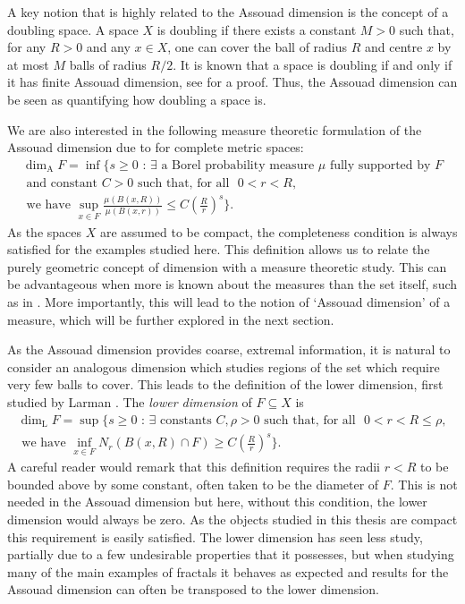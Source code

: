 A key notion that is highly related to the Assouad dimension is the concept of a doubling space. A space $X$ is doubling if there exists a constant $M > 0$ such that, for any $R > 0$ and any $x \in X$, one can cover the ball of radius $R$ and centre $x$ by at most $M$ balls of radius $R/2$. It is known that a space is doubling if and only if it has finite Assouad dimension, see \cite[Lemma 9.4]{robinson} for a proof. Thus, the Assouad dimension can be seen as quantifying how doubling a space is.

We are also interested in the following measure theoretic formulation of the Assouad dimension due to \cite{luksak, konyagin} for complete metric spaces: 
\begin{align*}
   \dim_{\text{A}} F = \inf \Bigg\{ s \geq 0 \, \,  : \, \exists \text{ a Borel probability measure } \mu \text{ fully supported by }F \\  
   \text{ and constant }C > 0\text{  such that, } \text{for all } \, \, 0< r< R, \\ 
   \text{ we have  }  \sup_{x\in F} \frac{\mu(B(x,R))}{\mu(B(x,r))} \leq C\left(\frac{R}{r}\right)^{s} \Bigg\}. 
\end{align*}
As the spaces $X$ are assumed to be compact, the completeness condition is always satisfied for the examples studied here. This definition allows us to relate the purely geometric concept of dimension with a measure theoretic study. This can be advantageous when more is known about the measures than the set itself, such as in \cite{fraser-howroyd1}. More importantly, this will lead to the notion of `Assouad dimension' of a measure, which will be further explored in the next section. 


As the Assouad dimension provides coarse, extremal information, it is natural to consider an analogous dimension which studies regions of the set which require very few balls to cover. This leads to the definition of the lower dimension, first studied by Larman \cite{larman1,larman2}. The \textit{lower dimension} of $F \subseteq X$ is 
\begin{multline*}
\dim_{\text{L}} F = \sup \Bigg\{ s \geq 0 \, \,  : \, \exists \text{ constants }C, \rho > 0 \text{ such that, for all } \, \, 0< r< R \leq \rho,\\ \text{ we have  }\inf_{x\in F} N_r (B(x,R)\cap F) \geq C\left(\frac{R}{r}\right)^{s} \Bigg\}.
\end{multline*}
A careful reader would remark that this definition requires the radii $r< R$ to be bounded above by some constant, often taken to be the diameter of $F$. This is not needed in the Assouad dimension but here, without this condition, the lower dimension would always be zero. As the objects studied in this thesis are compact this requirement is easily satisfied. The lower dimension has seen less study, partially due to a few undesirable properties that it possesses, but when studying many of the main examples of fractals it behaves as expected and results for the Assouad dimension can often be transposed to the lower dimension. 

